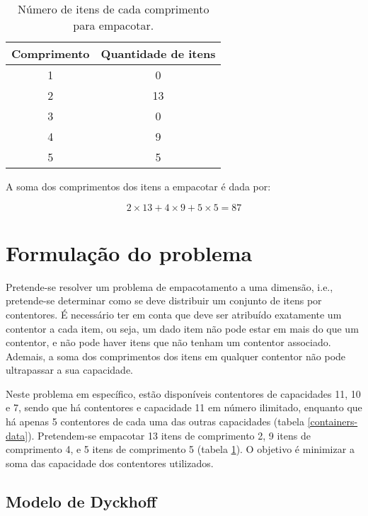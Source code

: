 \documentclass[12pt, a4paper, titlepage]{article}
\begin{document}
\begin{table}[H]
    \begin{center}
        \begin{tabular}{c|c}
            Comprimento & Quantidade de itens \\
            \hline
            1           & 0                    \\
            2           & 13                   \\
            3           & 0                    \\
            4           & 9                    \\
            5           & 5
        \end{tabular}
    \end{center}
    \caption{Número de itens de cada comprimento para empacotar.}
    \label{items-data}
\end{table}

A soma dos comprimentos dos itens a empacotar é dada por:

\begin{equation}
    2 \times 13 + 4 \times 9 + 5 \times 5 = 87
    \label{eq:items-sum}
\end{equation}

\section{Formulação do problema}

Pretende-se resolver um problema de empacotamento a uma dimensão, i.e., pretende-se determinar como
se deve distribuir um conjunto de itens por contentores. É necessário ter em conta que deve ser
atribuído exatamente um contentor a cada item, ou seja, um dado item não pode estar em mais do que
um contentor, e não pode haver itens que não tenham um contentor associado. Ademais, a soma dos
comprimentos dos itens em qualquer contentor não pode ultrapassar a sua capacidade.

Neste problema em específico, estão disponíveis contentores de capacidades 11, 10 e 7, sendo que há
contentores e capacidade 11 em número ilimitado, enquanto que há apenas 5 contentores de cada uma
das outras capacidades (tabela \ref{containers-data}). Pretendem-se empacotar 13 itens de
comprimento 2, 9 itens de comprimento 4, e 5 itens de comprimento 5 (tabela \ref{items-data}). O
objetivo é minimizar a soma das capacidade dos contentores utilizados.

\subsection{Modelo de Dyckhoff}
\end{document}
